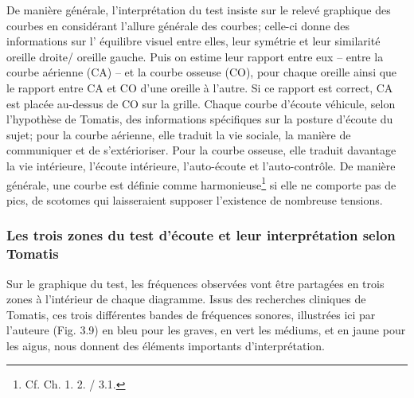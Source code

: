 De manière générale, l'interprétation du test insiste sur le relevé graphique
des
courbes en considérant l'allure générale des courbes; celle-ci  donne des informations sur  l' équilibre 
visuel entre elles, leur symétrie 
 et leur similarité oreille droite/ oreille gauche. 
Puis on estime
leur rapport entre eux -- entre la courbe aérienne (CA) -- et la courbe osseuse (CO),
pour chaque oreille ainsi que le rapport entre CA et CO d\textquoteright une
oreille à l'autre. Si ce rapport est correct, CA est placée au-dessus
de CO sur la grille.
Chaque courbe d'écoute  véhicule, selon l'hypothèse de Tomatis, des informations spécifiques
sur la posture d'écoute du sujet; pour la courbe aérienne, elle  traduit la vie sociale, la manière de 
communiquer
et de s'extérioriser. Pour la courbe osseuse, elle traduit davantage la vie 
intérieure,  l'écoute intérieure, l\textquoteright auto-écoute et  l\textquoteright auto-contrôle.
De manière générale, une courbe est définie comme harmonieuse\footnote{Cf. Ch. 1. 2. / 3.1.}
si elle ne comporte pas de
pics, de scotomes
qui laisseraient
supposer l'existence de nombreuse tensions.
\subsubsection{Les trois zones du test d'écoute et leur interprétation selon Tomatis}

Sur le graphique du test, les fréquences observées vont être partagées en
trois zones à l\textquoteright intérieur
de chaque diagramme. Issus des recherches cliniques de Tomatis, %
 ces trois différentes bandes de fréquences sonores, illustrées ici par l'auteure (Fig. 3.9) en bleu pour les 
 graves, en 
 vert les médiums, et 
en jaune pour les aigus,  nous donnent des éléments importants 
d'interprétation.

